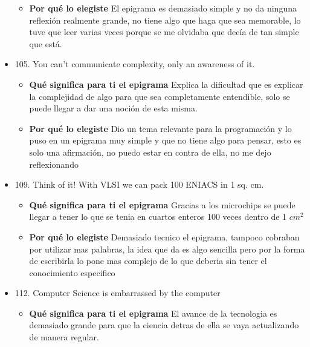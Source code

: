 \documentclass{article}
\begin{document}
\begin{itemize}
\begin{itemize}
                
            \item \textbf{ Por qué lo elegiste}
            \newline El epigrama es demasiado simple y no da ninguna reflexión realmente grande, no tiene algo que haga que sea memorable, lo tuve que leer varias veces porque se me olvidaba que decía de tan simple que está.
        \end{itemize}
    \item 105. You can’t communicate complexity, only an awareness of it.
            \begin{itemize}
            \item \textbf{ Qué significa para ti el epigrama} 
                \newline Explica la dificultad que es explicar la complejidad de algo para que sea completamente entendible, solo se puede llegar a dar una noción de esta misma.
            
                
            \item \textbf{ Por qué lo elegiste}
            \newline Dio un tema relevante para la programación y lo puso en un epigrama muy simple y que no tiene algo para pensar, esto es solo una afirmación, no puedo estar en contra de ella, no me dejo reflexionando
        \end{itemize}
    \item 109. Think of it! With VLSI we can pack 100 ENIACS in 1 sq. cm.
            \begin{itemize}
            \item \textbf{ Qué significa para ti el epigrama} 
            \newline Gracias a los microchips se puede llegar a tener lo que se tenia en cuartos enteros 100 veces dentro de 1 $cm^2$
                
                
            \item \textbf{ Por qué lo elegiste}
            \newline Demasiado tecnico el epigrama, tampoco cobraban por utilizar mas palabras, la idea que da es algo sencilla pero por la forma de escribirla lo pone mas complejo de lo que deberia sin tener el conocimiento especifico
        \end{itemize}
    \item 112. Computer Science is embarrassed by the computer
            \begin{itemize}
            \item \textbf{ Qué significa para ti el epigrama} 
                \newline El avance de la tecnologia es demasiado grande para que la ciencia detras de ella se vaya actualizando de manera regular.
            

\end{itemize}
\end{itemize}
\end{document}
